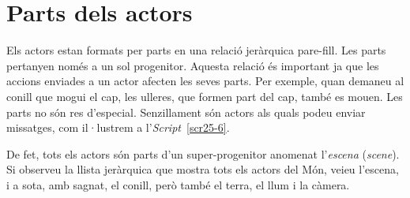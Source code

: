 \section{Parts dels actors}
Els actors estan formats per parts en una relació jeràrquica pare-fill. Les parts pertanyen només a un sol progenitor. Aquesta relació és important ja que les accions enviades a un actor afecten les seves parts. Per exemple, quan demaneu al conill que mogui el cap, les ulleres, que formen part del cap, també es mouen. Les parts no són res d'especial. Senzillament són actors als quals podeu enviar missatges, com il·lustrem a l'\emph{Script}~\ref{scr25-6}.

De fet, tots els actors són parts d'un super-progenitor anomenat l'\emph{escena} (\emph{scene}). Si observeu la llista jeràrquica que mostra tots els actors del Món, veieu l'escena, i a sota, amb sagnat, el conill, però també el terra, el llum i la càmera.  

